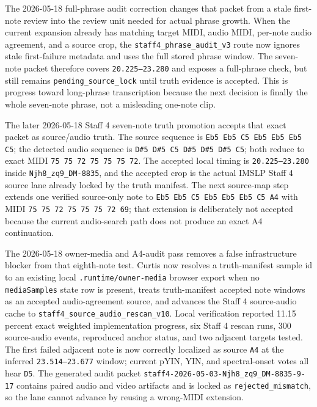 \documentclass[12pt,letterpaper]{article}
\begin{document}
The 2026-05-18 full-phrase audit correction changes that packet from a stale first-note review into the review unit needed for actual phrase growth. When the current expansion already has matching target MIDI, audio MIDI, per-note audio agreement, and a source crop, the \texttt{staff4\_phrase\_audit\_v3} route now ignores stale first-failure metadata and uses the full stored phrase window. The seven-note packet therefore covers \texttt{20.225--23.280} and exposes a full-phrase check, but still remains \texttt{pending\_source\_lock} until truth evidence is accepted. This is progress toward long-phrase transcription because the next decision is finally the whole seven-note phrase, not a misleading one-note clip.

The later 2026-05-18 Staff 4 seven-note truth promotion accepts that exact packet as source/audio truth. The source sequence is \texttt{Eb5 Eb5 C5 Eb5 Eb5 Eb5 C5}; the detected audio sequence is \texttt{D\#5 D\#5 C5 D\#5 D\#5 D\#5 C5}; both reduce to exact MIDI \texttt{75 75 72 75 75 75 72}. The accepted local timing is \texttt{20.225--23.280} inside \texttt{Njh8\_zq9\_DM-8835}, and the accepted crop is the actual IMSLP Staff 4 source lane already locked by the truth manifest. The next source-map step extends one verified source-only note to \texttt{Eb5 Eb5 C5 Eb5 Eb5 Eb5 C5 A4} with MIDI \texttt{75 75 72 75 75 75 72 69}; that extension is deliberately not accepted because the current audio-search path does not produce an exact A4 continuation.

The 2026-05-18 owner-media and A4-audit pass removes a false infrastructure blocker from that eighth-note test. Curtis now resolves a truth-manifest sample id to an existing local \texttt{.runtime/owner-media} browser export when no \texttt{mediaSamples} state row is present, treats truth-manifest accepted note windows as an accepted audio-agreement source, and advances the Staff 4 source-audio cache to \texttt{staff4\_source\_audio\_rescan\_v10}. Local verification reported 11.15 percent exact weighted implementation progress, six Staff 4 rescan runs, 300 source-audio events, reproduced anchor status, and two adjacent targets tested. The first failed adjacent note is now correctly localized as source \texttt{A4} at the inferred \texttt{23.514--23.677} window; current pYIN, YIN, and spectral-onset votes all hear \texttt{D5}. The generated audit packet \texttt{staff4-2026-05-03-Njh8\_zq9\_DM-8835-9-17} contains paired audio and video artifacts and is locked as \texttt{rejected\_mismatch}, so the lane cannot advance by reusing a wrong-MIDI extension.
\end{document}
